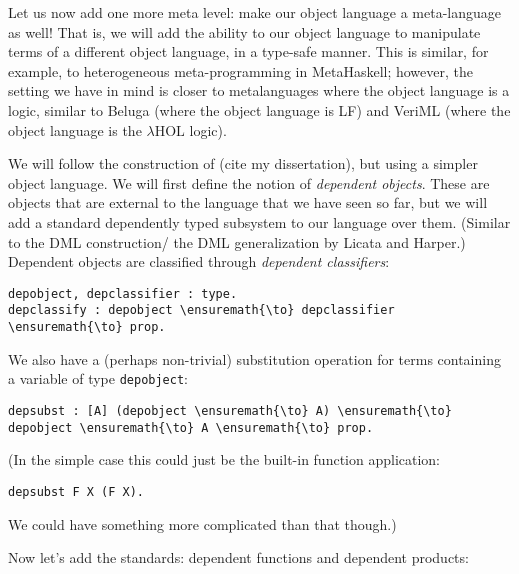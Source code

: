 Let us now add one more meta level: make our object language a
meta-language as well! That is, we will add the ability to our object
language to manipulate terms of a different object language, in a
type-safe manner. This is similar, for example, to heterogeneous
meta-programming in MetaHaskell; however, the setting we have in mind is
closer to metalanguages where the object language is a logic, similar to
Beluga (where the object language is LF) and VeriML (where the object
language is the \(\lambda\text{HOL}\) logic).

We will follow the construction of (cite my dissertation), but using a
simpler object language. We will first define the notion of
\emph{dependent objects}. These are objects that are external to the
language that we have seen so far, but we will add a standard
dependently typed subsystem to our language over them. (Similar to the
DML construction/ the DML generalization by Licata and Harper.)
Dependent objects are classified through \emph{dependent classifiers}:

\begin{verbatim}
depobject, depclassifier : type.
depclassify : depobject \ensuremath{\to} depclassifier \ensuremath{\to} prop.
\end{verbatim}

We also have a (perhaps non-trivial) substitution operation for terms
containing a variable of type \texttt{depobject}:

\begin{verbatim}
depsubst : [A] (depobject \ensuremath{\to} A) \ensuremath{\to} depobject \ensuremath{\to} A \ensuremath{\to} prop.
\end{verbatim}

(In the simple case this could just be the built-in function
application:

\begin{verbatim}
depsubst F X (F X).
\end{verbatim}

We could have something more complicated than that though.)

Now let's add the standards: dependent functions and dependent products:

